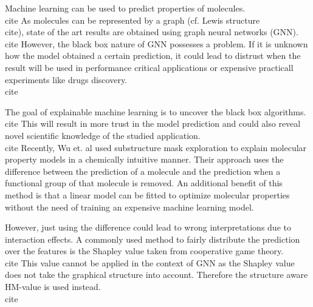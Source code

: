 \documentclass[twoside,twocolumn,9pt]{article}
\begin{document}

Machine learning can be used to predict properties of molecules.\\cite{} As molecules can be 
represented by a graph (cf. Lewis structure\\cite{}), state of the art results are obtained 
using graph neural networks (GNN).\\cite{} However, the black box nature of GNN possesses a 
problem. If it is unknown how the model obtained a certain prediction, it could lead to 
distrust when the result will be used in performance critical applications or expensive 
practicall experiments like drugs discovery.\\cite{} 

The goal of explainable machine learning is to uncover the black box algorithms.\\cite{}
This will result in more trust in the model prediction and could also reveal
novel scientific knowledge of the studied application.\\cite{} Recently, Wu et. al used 
substructure mask exploration to explain molecular property models in a chemically 
intuitive manner.\cite{} Their approach uses the difference between the prediction 
of a molecule and the prediction when a functional group of that molecule is removed. 
An additional benefit of this method is that a linear model can be fitted to optimize 
molecular properties without the need of training an expensive machine learning model.

However, just using the difference could lead to wrong interpretations due to interaction 
effects.\cite{} A commonly used method to fairly distribute the prediction over the 
features is the Shapley value taken from cooperative game theory.\\cite{} This value cannot 
be applied in the context of GNN as the Shapley value does not take the graphical structure 
into account. Therefore the structure aware HM-value is used instead.\\cite{}
\end{document}
